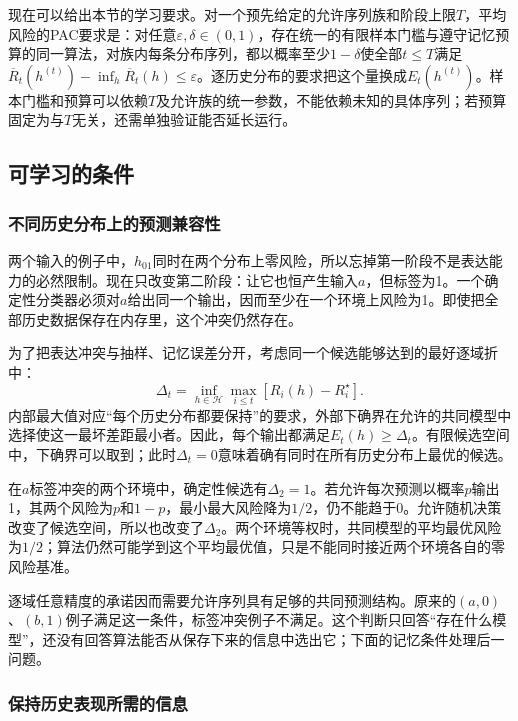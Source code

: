 现在可以给出本节的学习要求。对一个预先给定的允许序列族和阶段上限$T$，平均风险的PAC要求是：对任意$\varepsilon,\delta\in(0,1)$，存在统一的有限样本门槛与遵守记忆预算的同一算法，对族内每条分布序列，都以概率至少$1-\delta$使全部$t\leq T$满足
$\overline R_t(h^{(t)})-\inf_h\overline R_t(h)\leq\varepsilon$。逐历史分布的要求把这个量换成$E_t(h^{(t)})$。样本门槛和预算可以依赖$T$及允许族的统一参数，不能依赖未知的具体序列；若预算固定为与$T$无关，还需单独验证能否延长运行。

\subsection{可学习的条件}

\subsubsection{不同历史分布上的预测兼容性}

两个输入的例子中，$h_{01}$同时在两个分布上零风险，所以忘掉第一阶段不是表达能力的必然限制。现在只改变第二阶段：让它也恒产生输入$a$，但标签为1。一个确定性分类器必须对$a$给出同一个输出，因而至少在一个环境上风险为1。即使把全部历史数据保存在内存里，这个冲突仍然存在。

为了把表达冲突与抽样、记忆误差分开，考虑同一个候选能够达到的最好逐域折中：
\begin{equation}
 \Delta_t=\inf_{h\in\mathcal H}\max_{i\leq t}[R_i(h)-R_i^\star].
 \label{eq:continual-compatibility}
\end{equation}
内部最大值对应“每个历史分布都要保持”的要求，外部下确界在允许的共同模型中选择使这一最坏差距最小者。因此，每个输出都满足$E_t(h)\geq\Delta_t$。有限候选空间中，下确界可以取到；此时$\Delta_t=0$意味着确有同时在所有历史分布上最优的候选。

在$a$标签冲突的两个环境中，确定性候选有$\Delta_2=1$。若允许每次预测以概率$p$输出1，其两个风险为$p$和$1-p$，最小最大风险降为$1/2$，仍不能趋于0。允许随机决策改变了候选空间，所以也改变了$\Delta_2$。两个环境等权时，共同模型的平均最优风险为$1/2$；算法仍然可能学到这个平均最优值，只是不能同时接近两个环境各自的零风险基准。

逐域任意精度的承诺因而需要允许序列具有足够的共同预测结构。原来的$(a,0)$、$(b,1)$例子满足这一条件，标签冲突例子不满足。这个判断只回答“存在什么模型”，还没有回答算法能否从保存下来的信息中选出它；下面的记忆条件处理后一问题。

\subsubsection{保持历史表现所需的信息}

